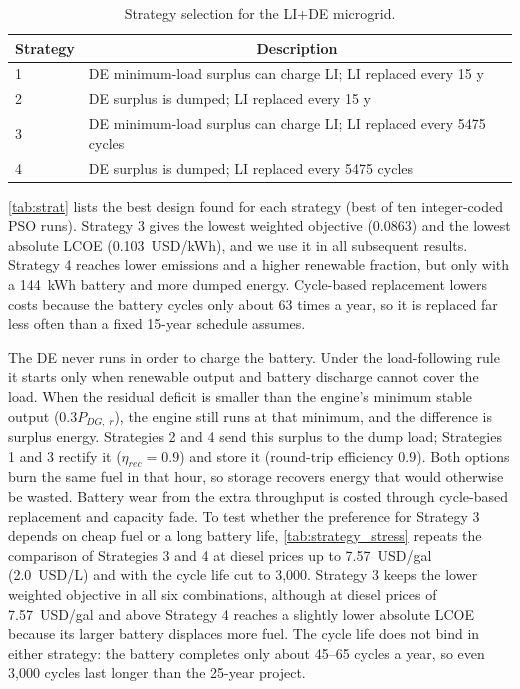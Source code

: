 \documentclass[final,3p,times]{elsarticle}
\begin{document}
\begin{table}[htbp] 
\centering
\begin{tabular}{p{0.75cm} p{10cm}}
\toprule
\multicolumn{1}{c}{\textbf{Strategy}} & \multicolumn{1}{c}{\textbf{Description}}    \\
\midrule
1 & DE minimum-load surplus can charge LI; LI replaced every 15 y \\[1ex]
2 & DE surplus is dumped; LI replaced every 15 y \\[1ex]
3 & DE minimum-load surplus can charge LI; LI replaced every 5475 cycles \\[1ex]
4 & DE surplus is dumped; LI replaced every 5475 cycles \\
\bottomrule
\end{tabular}
\caption{Strategy selection for the LI+DE microgrid.}
\label{tab:strat_select} 
\end{table}

\cref{tab:strat} lists the best design found for each strategy (best of ten integer-coded PSO runs). Strategy 3 gives the lowest weighted objective (0.0863) and the lowest absolute LCOE (0.103~USD/kWh), and we use it in all subsequent results. Strategy 4 reaches lower emissions and a higher renewable fraction, but only with a 144~kWh battery and more dumped energy. Cycle-based replacement lowers costs because the battery cycles only about 63 times a year, so it is replaced far less often than a fixed 15-year schedule assumes.

The DE never runs in order to charge the battery. Under the load-following rule it starts only when renewable output and battery discharge cannot cover the load. When the residual deficit is smaller than the engine's minimum stable output ($0.3P_{DG,\;r}$), the engine still runs at that minimum, and the difference is surplus energy. Strategies 2 and 4 send this surplus to the dump load; Strategies 1 and 3 rectify it ($\eta_{rec} = 0.9$) and store it (round-trip efficiency 0.9). Both options burn the same fuel in that hour, so storage recovers energy that would otherwise be wasted. Battery wear from the extra throughput is costed through cycle-based replacement and capacity fade. To test whether the preference for Strategy 3 depends on cheap fuel or a long battery life, \cref{tab:strategy_stress} repeats the comparison of Strategies 3 and 4 at diesel prices up to 7.57~USD/gal (2.0~USD/L) and with the cycle life cut to 3,000. Strategy 3 keeps the lower weighted objective in all six combinations, although at diesel prices of 7.57~USD/gal and above Strategy 4 reaches a slightly lower absolute LCOE because its larger battery displaces more fuel. The cycle life does not bind in either strategy: the battery completes only about 45--65 cycles a year, so even 3,000 cycles last longer than the 25-year project.
\end{document}
